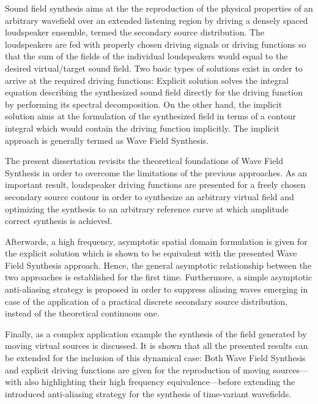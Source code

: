 Sound field synthesis aims at the the reproduction of the physical properties of an arbitrary wavefield over an extended listening region by driving a densely spaced loudspeaker ensemble, termed the secondary source distribution.
The loudspeakers are fed with properly chosen driving signals or driving functions so that the sum of the fields of the individual loudspeakers would equal to the desired virtual/target sound field.
Two basic types of solutions exist in order to arrive at the required driving functions:
Explicit solution solves the integral equation describing the synthesized sound field directly for the driving function by performing its spectral decomposition.
On the other hand, the implicit solution aims at the formulation of the synthesized field in terms of a contour integral which would contain the driving function implicitly.
The implicit approach is generally termed as Wave Field Synthesis.

The present dissertation revisits the theoretical foundations of Wave Field Synthesis in order to overcome the limitations of the previous approaches.
As an important result, loudspeaker driving functions are presented for a freely chosen secondary source contour in order to synthesize an arbitrary virtual field and optimizing the synthesis to an arbitrary reference curve at which amplitude correct synthesis is achieved.

Afterwards, a high frequency, asymptotic spatial domain formulation is given for the explicit solution which is shown to be equivalent with the presented Wave Field Synthesis approach.
Hence, the general asymptotic relationship between the two approaches is established for the first time.
Furthermore, a simple asymptotic anti-aliasing strategy is proposed in order to suppress aliasing waves emerging in case of the application of a practical discrete secondary source distribution, instead of the theoretical continuous one.

Finally, as a complex application example the synthesis of the field generated by moving virtual sources is discussed.
It is shown that all the presented results can be extended for the inclusion of this dynamical case: 
Both Wave Field Synthesis and explicit driving functions are given for the reproduction of moving sources---with also highlighting their high frequency equivalence---before extending the introduced anti-aliasing strategy for the synthesis of time-variant wavefields.


%

